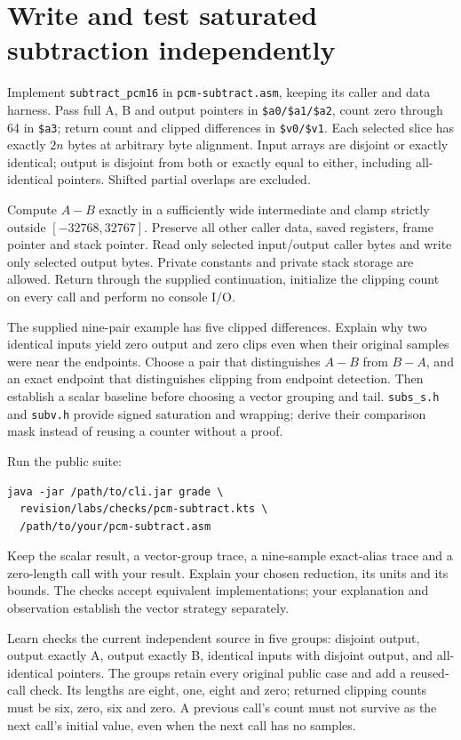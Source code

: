 \section{Write and test saturated subtraction independently}

Implement \texttt{subtract\_pcm16} in \texttt{pcm-subtract.asm}, keeping its
caller and data harness. Pass full A, B and output pointers in
\texttt{\$a0/\$a1/\$a2}, count zero through 64 in \texttt{\$a3}; return count
and clipped differences in \texttt{\$v0/\$v1}. Each selected slice has exactly
$2n$ bytes at arbitrary byte alignment. Input arrays are disjoint or exactly
identical; output is disjoint from both or exactly equal to either, including
all-identical pointers. Shifted partial overlaps are excluded.

Compute $A-B$ exactly in a sufficiently wide intermediate and clamp strictly
outside $[-32768,32767]$. Preserve all other caller data, saved registers, frame
pointer and stack pointer. Read only selected input/output caller bytes and write
only selected output bytes. Private constants and private stack storage are
allowed. Return through the supplied continuation, initialize the clipping count
on every call and perform no console I/O.

The supplied nine-pair example has five clipped differences. Explain why two
identical inputs yield zero output and zero clips even when their original
samples were near the endpoints. Choose a pair that distinguishes $A-B$ from
$B-A$, and an exact endpoint that distinguishes clipping from endpoint detection.
Then establish a scalar baseline before choosing a vector grouping and tail.
\texttt{subs\_s.h} and \texttt{subv.h} provide signed saturation and wrapping;
derive their comparison mask instead of reusing a counter without a proof.

Run the public suite:
\begin{verbatim}
java -jar /path/to/cli.jar grade \
  revision/labs/checks/pcm-subtract.kts \
  /path/to/your/pcm-subtract.asm
\end{verbatim}
Keep the scalar result, a vector-group trace, a nine-sample exact-alias trace and
a zero-length call with your result. Explain your chosen reduction, its units and
its bounds. The checks accept equivalent implementations; your explanation and
observation establish the vector strategy separately.


Learn checks the current independent source in five groups: disjoint output,
output exactly A, output exactly B, identical inputs with disjoint output, and
all-identical pointers. The groups retain every original public case and add a
reused-call check. Its lengths are eight, one, eight and zero; returned clipping
counts must be six, zero, six and zero. A previous call's count must not survive
as the next call's initial value, even when the next call has no samples.

